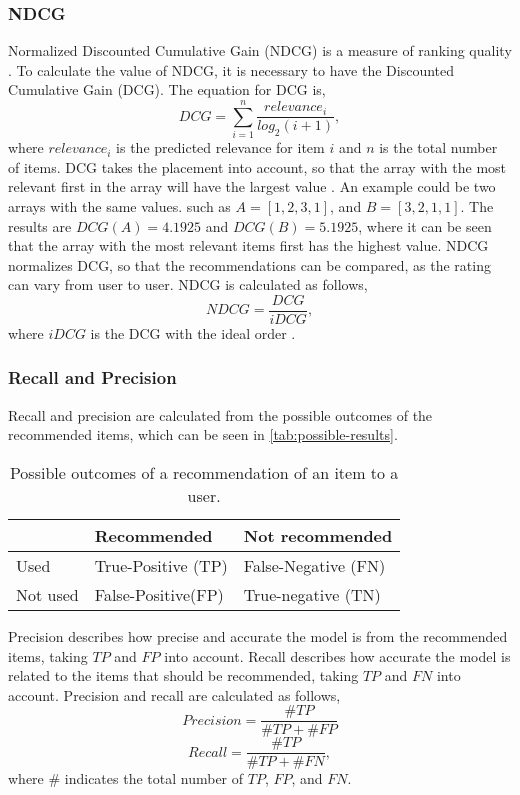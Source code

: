 \subsubsection{NDCG}
Normalized Discounted Cumulative Gain (NDCG) is a measure of ranking quality \cite{NDCG-evaluation}.
To calculate the value of NDCG, it is necessary to have the Discounted Cumulative Gain (DCG).
The equation for DCG is,
\begin{equation}
    DCG = \sum_{i=1}^{n} \frac{relevance_i}{log_2(i+1)},
\end{equation}
where $relevance_i$ is the predicted relevance for item $i$ and $n$ is the total number of items.
DCG takes the placement into account, so that the array with the most relevant first in the array will have the largest value \cite{NDCG-evaluation,Handbook}.
An example could be two arrays with the same values. such as $A = [1, 2, 3, 1]$, and $B = [3, 2, 1, 1]$. The results are $DCG(A) = 4.1925$ and $DCG(B) = 5.1925$, where it can be seen that the array with the most relevant items first has the highest value.
NDCG normalizes DCG, so that the recommendations can be compared, as the rating can vary from user to user.
NDCG is calculated as follows,
\begin{equation}
    NDCG = \frac{DCG}{iDCG},
\end{equation}
where $iDCG$ is the DCG with the ideal order \cite{NDCG-evaluation,Handbook}.

\subsubsection{Recall and Precision}
Recall and precision are calculated from the possible outcomes of the recommended items, which can be seen in \autoref{tab:possible-results}.
\begin{table}[]
    \centering
    \begin{tabular}{|l|l|l|}
        \hline
        \rowcolor[HTML]{FFFFFF}
                 & Recommended        & Not recommended     \\ \hline
        Used     & True-Positive (TP) & False-Negative (FN) \\ \hline
        Not used & False-Positive(FP) & True-negative (TN)  \\ \hline
    \end{tabular}
    \caption{Possible outcomes of a recommendation of an item to a user.}
    \label{tab:possible-results}
\end{table}
Precision describes how precise and accurate the model is from the recommended items, taking $TP$ and $FP$ into account.
Recall describes how accurate the model is related to the items that should be recommended, taking $TP$ and $FN$ into account.
Precision and recall are calculated as follows,
\begin{equation}
    Precision = \frac{\#TP}{\#TP + \# FP}
\end{equation}
\begin{equation}
    Recall = \frac{\#TP}{\#TP + \# FN},
\end{equation}
where \# indicates the total number of $TP$, $FP$, and $FN$.
